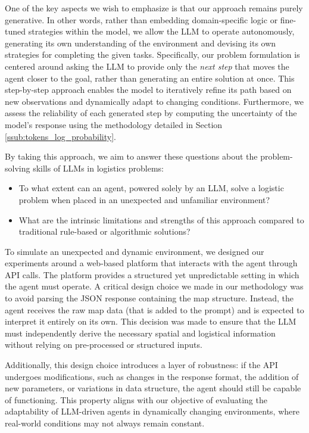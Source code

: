 One of the key aspects we wish to emphasize is that our approach remains purely
generative. In other words, rather than embedding domain-specific logic or fine-tuned
strategies within the model, we allow the LLM to operate autonomously,
generating its own understanding of the environment and devising its own
strategies for completing the given tasks. Specifically, our problem formulation
is centered around asking the LLM to provide only the \emph{next step} that moves
the agent closer to the goal, rather than generating an entire solution at once.
This step-by-step approach enables the model to iteratively refine its path based
on new observations and dynamically adapt to changing conditions. Furthermore, we
assess the reliability of each generated step by computing the uncertainty of the
model's response using the methodology detailed in Section \ref{ssub:tokens_log_probability}.

By taking this approach, we aim to answer these questions about the problem-solving
skills of LLMs in logistics problems:
\begin{itemize}
  \item To what extent can an agent, powered solely by an LLM, solve a logistic problem
    when placed in an unexpected and unfamiliar environment?

  \item What are the intrinsic limitations and strengths of this approach compared
    to traditional rule-based or algorithmic solutions?
\end{itemize}

To simulate an unexpected and dynamic environment, we designed our experiments around
a web-based platform that interacts with the agent through API calls. The
platform provides a structured yet unpredictable setting in which the agent must
operate. A critical design choice we made in our methodology was to avoid parsing
the JSON response containing the map structure. Instead, the agent receives the raw
map data (that is added to the prompt) and is expected to interpret it entirely on
its own. This decision was made to ensure that the LLM must independently derive
the necessary spatial and logistical information without relying on pre-processed
or structured inputs.

Additionally, this design choice introduces a layer of robustness: if the API
undergoes modifications, such as changes in the response format, the addition of
new parameters, or variations in data structure, the agent should still be
capable of functioning. This property aligns with our objective of evaluating the
adaptability of LLM-driven agents in dynamically changing environments, where
real-world conditions may not always remain constant.

